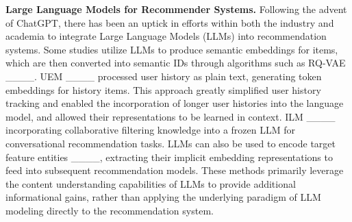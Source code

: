 \noindent \textbf{Large Language Models for Recommender Systems.} Following the advent of ChatGPT, there has been an uptick in efforts within both the industry and academia to integrate Large Language Models (LLMs) into recommendation systems. Some studies utilize LLMs to produce semantic embeddings for items, which are then converted into semantic IDs through algorithms such as RQ-VAE ____. UEM ____ processed user history as plain text, generating token embeddings for history items. This approach greatly simplified user history tracking and enabled the incorporation of longer user histories into the language model, and allowed their representations to be learned in context.
ILM ____ incorporating collaborative filtering knowledge into a frozen LLM for conversational recommendation tasks.
LLMs can also be used to encode target feature entities ____, extracting their implicit embedding representations to feed into subsequent recommendation models. 
These methods primarily leverage the content understanding capabilities of LLMs to provide additional informational gains, rather than applying the underlying paradigm of LLM modeling directly to the recommendation system.